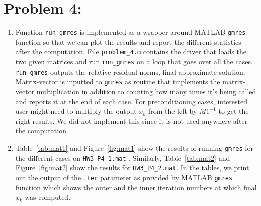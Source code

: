 \newpage
\section*{Problem 4:}
\begin{enumerate}
\item Function \texttt{run_gmres} is implemented as a wrapper around MATLAB \texttt{gmres} function so that we can plot the results and report the different statistics after the computation. File \texttt{problem_4.m} contains the driver that loads the two given matrices and run \texttt{run_gmres} on a loop that goes over all the cases. \texttt{run_gmres} outputs the relative residual norms, final approximate solution. Matrix-vector is inputted to \texttt{gmres} as routine that implements the matrix-vector multiplication in addition to counting how many times it's being called and reports it at the end of each case. For preconditioning cases, interested user might need to multiply the output $x_{k}$ from the left by $M1^{-1}$ to get the right results. We did not implement this since it is not used anywhere after the computation. 

\item Table~\ref{tab:mat1} and Figure~\ref{fig:mat1} show the results of running \texttt{gmres} for the different cases on \texttt{HW3_P4_1.mat} . Similarly, Table~\ref{tab:mat2} and Figure~\ref{fig:mat2} show the results for \texttt{HW3_P4_2.mat}. In the tables, we print out the output of the \texttt{iter} parameter as provided by MATLAB \texttt{gmres} function which shows the outer and
the inner iteration numbers at which final $x_{k}$ was computed.


\end{enumerate}
